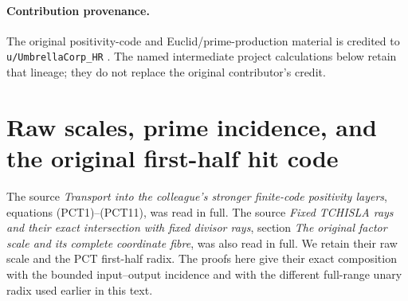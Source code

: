 \paragraph{Contribution provenance.} The original positivity-code and Euclid/prime-production material is credited to \texttt{u/UmbrellaCorp\_HR} \cite{UmbrellaContribution}. The named intermediate project calculations \cite{PositivityTransport} below retain that lineage; they do not replace the original contributor's credit.

\section{Raw scales, prime incidence, and the original first-half hit code}

The source \emph{Transport into the colleague's stronger finite-code
positivity layers}, equations (PCT1)--(PCT11), was read in full.
The source \emph{Fixed TCHISLA rays and their exact intersection with
fixed divisor rays}, section \emph{The original factor scale and its
complete coordinate fibre}, was also read in full.  We retain their
raw scale and the PCT first-half radix.  The proofs here give their
exact composition with the bounded input--output incidence and with
the different full-range unary radix used earlier in this text.

